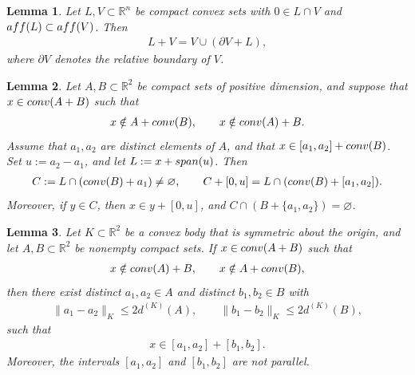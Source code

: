 \documentclass[10pt,a4paper]{amsart}
\newtheorem{lemma}{Lemma}
\begin{document}
\begin{lemma}\label{lemma:sum_decomposition}
    Let $L,V\subset\mathbb{R}^n$ be compact convex sets with $0\in L\cap V$ and $\textup{aff}(L)\subset \textup{aff}(V)$. Then
    \begin{align*}
        L+V=V\cup (\partial V+L),
    \end{align*}
    where $\partial V$ denotes the relative boundary of $V$.
\end{lemma}

\begin{lemma}\label{lemma:line_passing_technical_lemma}
    Let $A,B\subset\mathbb{R}^2$ be compact sets of positive dimension, and suppose that $x\in \textup{conv}(A+B)$ such that 
    \begin{align*}
        x\notin A+\textup{conv}(B),\qquad x\notin \textup{conv}(A)+B.
    \end{align*}
    Assume that $a_1,a_2$ are distinct elements of $A$, and that $x\in [a_1,a_2]+\textup{conv}(B)$. Set $u:=a_2-a_1$, and let $L:=x+\textup{span}(u)$. Then
    \begin{align*}
       C:= L\cap (\textup{conv}(B)+a_1)\neq \varnothing,\qquad C+[0,u]=L\cap (\textup{conv}(B)+[a_1,a_2]).
    \end{align*}
    Moreover, if $y\in C$, then $x\in y+[0,u]$, and $C\cap (B+\{a_1,a_2\})=\varnothing$.
\end{lemma}

\begin{lemma}\label{lemma:parallelogram_reduction_K_norm}
        Let $K\subset\mathbb{R}^2$ be a convex body that is symmetric about the origin, and let $A,B\subset\mathbb{R}^2$ be nonempty compact sets. If $x\in \textup{conv}(A+B)$ such that 
        \begin{align*}
            x\notin \textup{conv}(A)+B,\qquad x\notin A+\textup{conv}(B),
        \end{align*}
        then there exist distinct $a_1,a_2\in A$ and distinct $b_1,b_2\in B$ with
        \begin{align*}
            \|a_1-a_2\|_K\leq 2d^{(K)}(A),\qquad \|b_1-b_2\|_K\leq 2d^{(K)}(B),
        \end{align*}
        such that 
        \begin{align*}
            x\in [a_1,a_2]+[b_1,b_2].
        \end{align*}
        Moreover, the intervals $[a_1,a_2]$ and $[b_1,b_2]$ are not parallel.
\end{lemma}
\end{document}
